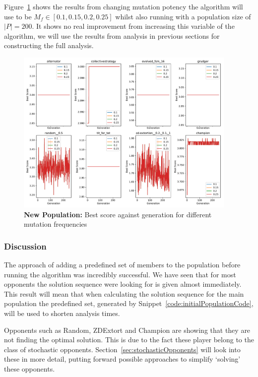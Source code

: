 Figure~\ref{fig:NEW-MUT-FREQ-bs-gen-all} shows the results from changing mutation potency the algorithm will use to be \(M_f \in [0.1,0.15,0.2,0.25] \) whilst also running with a population size of \(|P|=200\).
It shows no real improvement from increasing this variable of the algorithm, we will use the results from analysis in previous sections for constructing the full analysis.

\begin{figure}[ht]
    \includegraphics[width=0.95\textwidth, keepaspectratio, center]{./img/plots/NEW_MUT_FREQ_bs_v_gen_all.pdf}
    \caption{\textbf{New Population:} Best score against generation for different mutation frequencies}\label{fig:NEW-MUT-FREQ-bs-gen-all}
\end{figure}

\subsubsection{Discussion}\label{subsubsec:discussion}
The approach of adding a predefined set of members to the population before running the algorithm was incredibly successful.
We have seen that for most opponents the solution sequence were looking for is given almost immediately.
This result will mean that when calculating the solution sequence for the main population the predefined set, generated by Snippet~\ref{code:initialPopulationCode}, will be used to shorten analysis times.

Opponents such as Random, ZDExtort and Champion are showing that they are not finding the optimal solution.
This is due to the fact these player belong to the class of stochastic opponents.
Section~\ref{sec:stochasticOpponents} will look into these in more detail, putting forward possible approaches to simplify `solving' these opponents.

